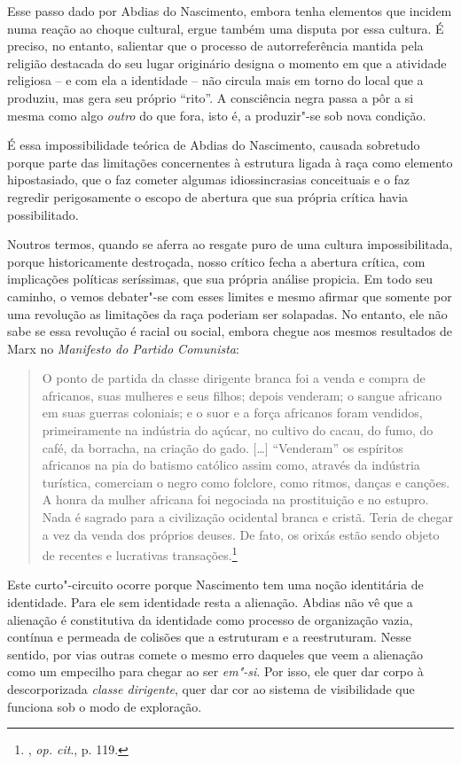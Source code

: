 Esse passo dado por Abdias do Nascimento, embora tenha elementos que
incidem numa reação ao choque cultural, ergue também uma disputa por
essa cultura. É preciso, no entanto, salientar que o processo de
autorreferência mantida pela religião destacada do seu lugar originário
designa o momento em que a atividade religiosa -- e com ela a identidade
-- não circula mais em torno do local que a produziu, mas gera seu
próprio ``rito''. A consciência negra passa a pôr a si mesma como algo
\emph{outro} do que fora, isto é, a produzir"-se sob nova condição.

É essa impossibilidade teórica de Abdias do Nascimento, causada
sobretudo porque parte das limitações concernentes à estrutura ligada à
raça como elemento hipostasiado, que o faz cometer algumas
idiossincrasias conceituais e o faz regredir perigosamente o escopo de
abertura que sua própria crítica havia possibilitado.

Noutros termos, quando se aferra ao resgate puro de uma cultura
impossibilitada, porque historicamente destroçada, nosso crítico fecha a
abertura crítica, com implicações políticas seríssimas, que sua própria
análise propicia. Em todo seu caminho, o vemos debater"-se com esses
limites e mesmo afirmar que somente por uma revolução as limitações da
raça poderiam ser solapadas. No entanto, ele não sabe se essa revolução
é racial ou social, embora chegue aos mesmos resultados de Marx no
\emph{Manifesto do Partido Comunista}:

\begin{quote}
O ponto de partida da classe dirigente branca foi a venda e compra de
africanos, suas mulheres e seus filhos; depois venderam; o sangue
africano em suas guerras coloniais; e o suor e a força africanos foram
vendidos, primeiramente na indústria do açúcar, no cultivo do cacau, do
fumo, do café, da borracha, na criação do gado. {[}\ldots{}{]} ``Venderam'' os
espíritos africanos na pia do batismo católico assim como, através da
indústria turística, comerciam o negro como folclore, como ritmos,
danças e canções. A honra da mulher africana foi negociada na
prostituição e no estupro. Nada é sagrado para a civilização ocidental
branca e cristã. Teria de chegar a vez da venda dos próprios deuses. De
fato, os orixás estão sendo objeto de recentes e lucrativas
transações.\footnote{, \emph{op. cit}., p. 119.}
\end{quote}

Este curto"-circuito ocorre porque Nascimento tem uma noção identitária
de identidade. Para ele sem identidade resta a alienação. Abdias não vê
que a alienação é constitutiva da identidade como processo de
organização vazia, contínua e permeada de colisões que a estruturam e a
reestruturam. Nesse sentido, por vias outras comete o mesmo erro
daqueles que veem a alienação como um empecilho para chegar ao ser
\emph{em"-si}. Por isso, ele quer dar corpo à descorporizada \emph{classe
dirigente}, quer dar cor ao sistema de visibilidade que funciona sob o
modo de exploração.


